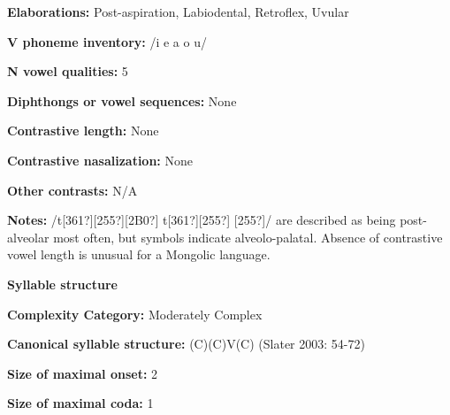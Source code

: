 \begin{styleBody}
\textbf{Elaborations:} Post-aspiration, Labiodental, Retroflex, Uvular
\end{styleBody}

\begin{styleBody}
\textbf{V phoneme inventory:} /i e a o u/
\end{styleBody}

\begin{styleBody}
\textbf{N vowel qualities:} 5
\end{styleBody}

\begin{styleBody}
\textbf{Diphthongs or vowel sequences:} None
\end{styleBody}

\begin{styleBody}
\textbf{Contrastive length:} None
\end{styleBody}

\begin{styleBody}
\textbf{Contrastive nasalization:} None
\end{styleBody}

\begin{styleBody}
\textbf{Other contrasts:} N/A
\end{styleBody}

\begin{styleBody}
\textbf{Notes:} /t[361?][255?][2B0?] t[361?][255?] [255?]/ are described as being post-alveolar most often, but symbols indicate alveolo-palatal. Absence of contrastive vowel length is unusual for a Mongolic language.
\end{styleBody}

\begin{styleBody}
\textbf{Syllable structure}
\end{styleBody}

\begin{styleBody}
\textbf{Complexity Category:} Moderately Complex
\end{styleBody}

\begin{styleBody}
\textbf{Canonical syllable structure:} (C)(C)V(C)\textbf{ }(Slater 2003: 54-72)
\end{styleBody}

\begin{styleBody}
\textbf{Size of maximal onset:} 2
\end{styleBody}

\begin{styleBody}
\textbf{Size of maximal coda:} 1
\end{styleBody}

